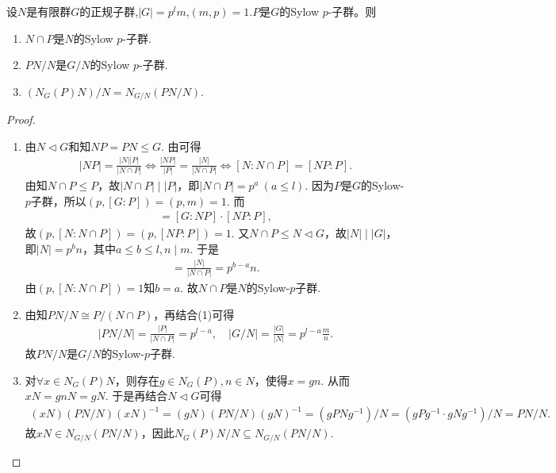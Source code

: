 \documentclass[../../main.tex]{subfiles}%
\begin{document}
\begin{proposition}\label{proposition:Sylow-p子群的一些性质}
设$N$是有限群$G$的正规子群,$|G|=p^lm$,$(m,p)=1$.$P$是$G$的Sylow $p$-子群。则
\begin{enumerate}[(1)]
\item\label{proposition:Sylow-p子群的一些性质-1} $N\cap P$是$N$的Sylow $p$-子群.

\item\label{proposition:Sylow-p子群的一些性质-2} $PN/N$是$G/N$的Sylow $p$-子群.

\item\label{proposition:Sylow-p子群的一些性质-3} $(N_G(P)N)/N = N_{G/N}(PN/N)$.
\end{enumerate}
\end{proposition}
\begin{proof}
\begin{enumerate}[(1)]
\item 由$N\lhd G$和知$NP=PN\leqslant G$. 由可得
\begin{align*}
|NP|=\frac{|N||P|}{|N\cap P|}\Longleftrightarrow \frac{|NP|}{|P|}=\frac{|N|}{|N\cap P|}\Longleftrightarrow [N:N\cap P] = [NP:P].
\end{align*}
由知$N\cap P\leqslant P$，故$|N\cap P|\mid |P|$，即$|N\cap P|=p^a\ (a\leqslant l)$.
因为$P$是$G$的Sylow-$p$子群，所以$(p,[G:P])=(p,m)=1$. 而
\begin{align*}
[G:P] = [G:NP]\cdot [NP:P],
\end{align*}
故$(p,[N:N\cap P])=(p,[NP:P])=1$. 又$N\cap P\leqslant N\lhd G$，故$|N|\mid |G|$，即$|N|=p^bn$，其中$a\leqslant b\leqslant l,n\mid m$. 于是
\begin{align*}
[N:N\cap P]=\frac{|N|}{|N\cap P|}=p^{b-a}n.
\end{align*}
由$(p,[N:N\cap P])=1$知$b=a$. 故$N\cap P$是$N$的Sylow-$p$子群.

\item 由知$PN/N\cong P/(N\cap P)$，再结合(1)可得
\begin{align*}
|PN/N|=\frac{|P|}{|N\cap P|}=p^{l-a},\quad |G/N|=\frac{|G|}{|N|}=p^{l-a}\frac{m}{n}.
\end{align*}
故$PN/N$是$G/N$的Sylow-$p$子群.

\item 对$\forall x\in N_G(P)N$，则存在$g\in N_G(P),n\in N$，使得$x=gn$. 从而$xN=gnN=gN$. 于是再结合$N\lhd G$可得
\begin{align*}
(xN)(PN/N)(xN)^{-1}=(gN)(PN/N)(gN)^{-1}=(gPNg^{-1})/N=(gPg^{-1}\cdot gNg^{-1})/N=PN/N.
\end{align*}
故$xN\in N_{G/N}(PN/N)$，因此$N_G(P)N/N\subseteq N_{G/N}(PN/N)$.


\end{enumerate}
\end{proof}
\end{document}
